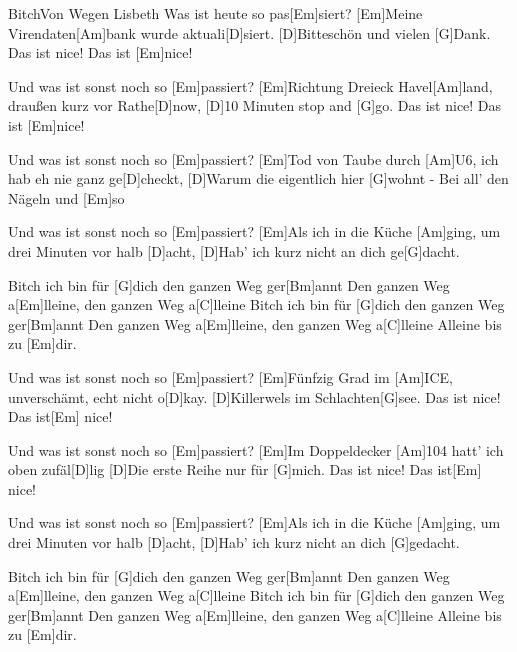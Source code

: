 \documentclass[../main.tex]{subfiles}
\begin{document}
\begin{song}[3]{Bitch}{Von Wegen Lisbeth}{}
Was ist heute so pas[Em]siert?
[Em]Meine Virendaten[Am]bank wurde aktuali[D]siert.
[D]Bitteschön und vielen [G]Dank. Das ist nice! Das ist [Em]nice!

Und was ist sonst noch so [Em]passiert?
[Em]Richtung Dreieck Havel[Am]land, draußen kurz vor Rathe[D]now,
[D]10 Minuten stop and [G]go. Das ist nice! Das ist [Em]nice!

Und was ist sonst noch so [Em]passiert?
[Em]Tod von Taube durch [Am]U6, ich hab eh nie ganz ge[D]checkt,
[D]Warum die eigentlich hier [G]wohnt - Bei all' den Nägeln und [Em]so

Und was ist sonst noch so [Em]passiert?
[Em]Als ich in die Küche [Am]ging, um drei Minuten vor halb [D]acht,
[D]Hab' ich kurz nicht an dich ge[G]dacht.

Bitch ich bin für [G]dich den ganzen Weg ger[Bm]annt
Den ganzen Weg a[Em]lleine, den ganzen Weg a[C]lleine
Bitch ich bin für [G]dich den ganzen Weg ger[Bm]annt
Den ganzen Weg a[Em]lleine, den ganzen Weg a[C]lleine
Alleine bis zu [Em]dir.

Und was ist sonst noch so [Em]passiert?
[Em]Fünfzig Grad im [Am]ICE, unverschämt, echt nicht o[D]kay.
[D]Killerwels im Schlachten[G]see. Das ist nice! Das ist[Em] nice!

Und was ist sonst noch so [Em]passiert?
[Em]Im Doppeldecker [Am]104 hatt' ich oben zufäl[D]lig
[D]Die erste Reihe nur für [G]mich. Das ist nice! Das ist[Em] nice!

Und was ist sonst noch so [Em]passiert?
[Em]Als ich in die Küche [Am]ging, um drei Minuten vor halb [D]acht,
[D]Hab' ich kurz nicht an dich [G]gedacht.

Bitch ich bin für [G]dich den ganzen Weg ger[Bm]annt
Den ganzen Weg a[Em]lleine, den ganzen Weg a[C]lleine
Bitch ich bin für [G]dich den ganzen Weg ger[Bm]annt
Den ganzen Weg a[Em]lleine, den ganzen Weg a[C]lleine
Alleine bis zu [Em]dir.

\end{song}
\end{document}
